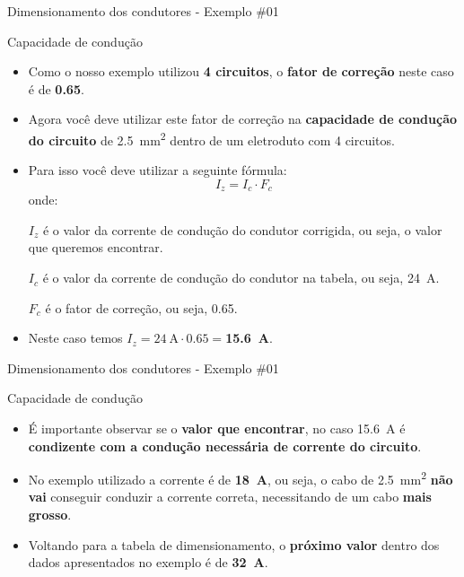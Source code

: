 \begin{frame}{Dimensionamento dos condutores - Exemplo \#01}
	\useshortskip
	\begin{block}{Capacidade de condução}
		\begin{itemize}
			\item Como o nosso exemplo utilizou \textbf{4 circuitos}, o \textbf{fator de correção} neste caso é de \textbf{\num{0,65}}.
			\item Agora você deve utilizar este fator de correção na \textbf{capacidade de condução do circuito} de \SI{2.5}{\milli\meter\squared} dentro de um eletroduto com 4 circuitos.
			\item Para isso você deve utilizar a seguinte fórmula:  \[ \boxed{I_z = I_c \cdot F_c} \]
			      onde:

			      $ I_z $ é o valor da corrente de condução do condutor corrigida, ou seja, o valor que queremos encontrar.

			      $ I_c $ é o valor da corrente de condução do condutor na tabela, ou seja, \SI{24}{\ampere}.

			      $ F_c $ é o fator de correção, ou seja, \num{0,65}.
			\item Neste caso temos $ I_z = \SI{24}{\ampere}\cdot \num{0,65}=$\textbf{\SI{15.6}{\ampere}}.
		\end{itemize}
	\end{block}
\end{frame}




\begin{frame}{Dimensionamento dos condutores - Exemplo \#01}
	\begin{block}{Capacidade de condução}
		\begin{itemize}
			\item É importante observar se o \textbf{valor que encontrar}, no caso \SI{15,6}{\ampere} é \textbf{condizente com a condução necessária de corrente do circuito}.
			\item No exemplo utilizado a corrente é de \textbf{\SI{18}{\ampere}}, ou seja, o cabo de \SI{2,5}{\milli\meter\squared} \textbf{não vai} conseguir conduzir a corrente correta, necessitando de um cabo \textbf{mais grosso}.
			\item Voltando para a tabela de dimensionamento, o \textbf{próximo valor} dentro dos dados apresentados no exemplo é de \textbf{\SI{32}{\ampere}}.
		\end{itemize}
	\end{block}
\end{frame}

